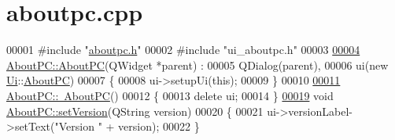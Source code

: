 \hypertarget{aboutpc_8cpp_source}{}\section{aboutpc.\+cpp}
\label{aboutpc_8cpp_source}

\begin{DoxyCode}
00001 \textcolor{preprocessor}{#include "\mbox{\hyperlink{aboutpc_8h}{aboutpc.h}}"}
00002 \textcolor{preprocessor}{#include "ui\_aboutpc.h"}
00003 
\mbox{\hyperlink{class_about_p_c_a89341c4427d97da60acf15dc929ad8a6}{00004}} \mbox{\hyperlink{class_about_p_c_a89341c4427d97da60acf15dc929ad8a6}{AboutPC::AboutPC}}(QWidget *parent) :
00005     QDialog(parent),
00006     ui(new \mbox{\hyperlink{namespace_ui}{Ui}}::\mbox{\hyperlink{class_about_p_c}{AboutPC}})
00007 \{
00008     ui->setupUi(\textcolor{keyword}{this});
00009 \}
00010 
\mbox{\hyperlink{class_about_p_c_a3cc0c4c81abc640d946003b078a47dd4}{00011}} \mbox{\hyperlink{class_about_p_c_a3cc0c4c81abc640d946003b078a47dd4}{AboutPC::~AboutPC}}()
00012 \{
00013     \textcolor{keyword}{delete} ui;
00014 \}
\mbox{\hyperlink{class_about_p_c_aa3815d4826d0c8d87122449537a0a4d5}{00019}} \textcolor{keywordtype}{void} \mbox{\hyperlink{class_about_p_c_aa3815d4826d0c8d87122449537a0a4d5}{AboutPC::setVersion}}(QString version)
00020 \{
00021     ui->versionLabel->setText(\textcolor{stringliteral}{"Version "} + version);
00022 \}
\end{DoxyCode}

